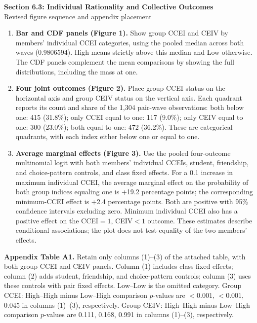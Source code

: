 \documentclass[11pt]{article}
\begin{document}
\begin{center}\large\textbf{Section 6.3: Individual Rationality and Collective Outcomes}\\[4pt]
\normalsize Revised figure sequence and appendix placement\end{center}
\begin{enumerate}
\setlength{\itemsep}{10pt}
\item \textbf{Bar and CDF panels (Figure 1).} Show group CCEI and CEIV by members' individual CCEI
categories, using the pooled median across both waves (0.9806594). High means strictly above this median
and Low otherwise. The CDF panels complement the mean comparisons
by showing the full distributions, including the mass at one.

\item \textbf{Four joint outcomes (Figure 2).} Place group CCEI status on the horizontal axis and group CEIV
status on the vertical axis. Each quadrant reports its count and share of the 1,304 pair-wave observations:
both below one: 415 (31.8\%); only CCEI equal to one: 117 (9.0\%); only CEIV equal to one: 300 (23.0\%); both equal to one: 472 (36.2\%). These are categorical quadrants, with each index either below one or equal to one.

\item \textbf{Average marginal effects (Figure 3).} Use the pooled four-outcome multinomial logit with both
members' individual CCEIs, student, friendship, and choice-pattern controls, and class fixed effects.
For a 0.1 increase in maximum individual CCEI, the average marginal effect on the probability of both group
indices equaling one is +19.2 percentage points; the corresponding minimum-CCEI effect is +2.4 percentage
points. Both are positive with 95\% confidence intervals excluding zero. Minimum individual CCEI also has
a positive effect on the CCEI$=1$, CEIV$<1$ outcome. These estimates describe conditional associations;
the plot does not test equality of the two members' effects.
\end{enumerate}

\textbf{Appendix Table A1.} Retain only columns (1)--(3) of the attached table, with both group CCEI and CEIV
panels. Column (1) includes class fixed effects; column (2) adds student, friendship, and choice-pattern controls;
column (3) uses these controls with pair fixed effects. Low--Low is the omitted category.
Group CCEI: High--High minus Low--High comparison $p$-values are $<0.001$, $<0.001$, 0.045 in columns (1)--(3), respectively.
Group CEIV: High--High minus Low--High comparison $p$-values are 0.111, 0.168, 0.991 in columns (1)--(3), respectively.
\end{document}
